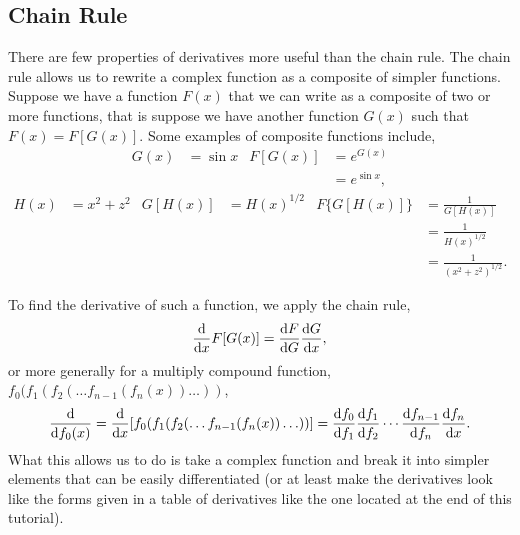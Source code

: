 \subsection{Chain Rule} \label{calc:chain}
There are few properties of derivatives more useful than the chain rule.  The
chain rule allows us to rewrite a complex function as a composite of simpler
functions.  Suppose we have a function $F(x)$ that we can write as a composite
of two or more functions, that is suppose we have another function $G(x)$ such
that $F(x) = F[G(x)]$.  Some examples of composite functions include,
\begin{align*}
    G(x) &= \sin x & F[G(x)] &= e^{G(x)} \\
    && &= e^{\sin x} ,
\end{align*}
\begin{align*}
    H(x) &= x^2 + z^2 & G[H(x)] &= H(x)^{1/2} & F\{G[H(x)]\} &= \frac{1}{G[H(x)]} \\
    && && &= \frac{1}{H(x)^{1/2}} \\
    && && &= \frac{1}{(x^2 + z^2)^{1/2}} .
\end{align*}

To find the derivative of such a function, we apply the chain rule,
\begin{equation*}
    \dv{}{x}F[G(x)] = \dv{F}{G}\dv{G}{x},
\end{equation*}
or more generally for a multiply compound function,
$f_0(f_1(f_2(\ldots f_{n-1}(f_n(x))\ldots))$,
\begin{equation}
    \dv{}{f_0(x)} = \dv{}{x}[f_0(f_1(f_2(\ldots f_{n-1}(f_n(x))\ldots))] =
    \dv{f_0}{f_1}\dv{f_1}{f_2}\cdots\dv{f_{n-1}}{f_n}\dv{f_n}{x} .
\end{equation}
What this allows us to do is take a complex function and break it into simpler
elements that can be easily differentiated (or at least make the derivatives
look like the forms given in a table of derivatives like the one located at the
end of this tutorial).

